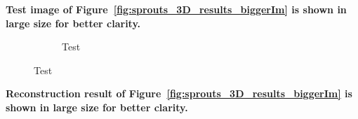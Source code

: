 \documentclass{article}
\begin{document}
\newpage
\textbf{Test image of Figure~\ref{fig:sprouts_3D_results_biggerIm}  is shown in large size for better clarity.}\\
\begin{figure}[!h]
    \begin{subfigure}[b]{\linewidth}
\captionsetup{labelformat=empty}
        \caption{\large{Test}}
     \end{subfigure}
\end{figure}
\newpage
\textbf{Reconstruction result of Figure~\ref{fig:sprouts_3D_results_biggerIm}  is shown in large size for better clarity.}\\
\end{document}
